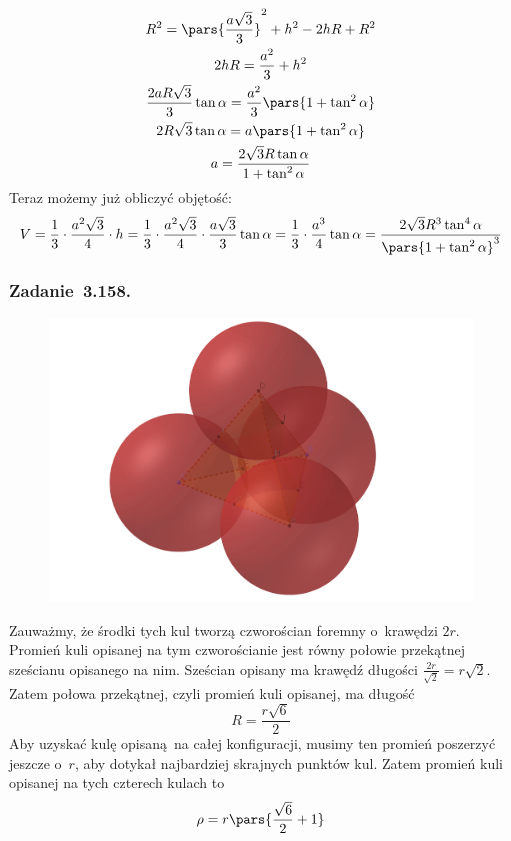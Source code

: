 \begin{gather*}
    R^2 = \pars{\frac{a\sqrt{3}}{3}}^2 + h^2 - 2hR + R^2\\
    2hR = \frac{a^2}{3} + h^2\\
    \frac{2aR\sqrt{3}}{3}\tan\alpha = \frac{a^2}{3}\pars{1 + \tan^2\alpha}\\
    2R\sqrt{3}\tan\alpha = a\pars{1 + \tan^2\alpha}\\
    a = \frac{2\sqrt{3}R\tan\alpha}{1 + \tan^2\alpha}
\end{gather*}
Teraz możemy już obliczyć objętość:
\begin{equation*}
    V
    = \frac{1}{3} \cdot \frac{a^2\sqrt{3}}{4} \cdot h
    = \frac{1}{3} \cdot \frac{a^2\sqrt{3}}{4} \cdot \frac{a\sqrt{3}}{3}\tan\alpha
    = \frac{1}{3} \cdot \frac{a^3}{4}\tan\alpha
    = \frac{2\sqrt{3}R^3\tan^4\alpha}{\pars{1 + \tan^2\alpha}^3}
\end{equation*}
\subsubsection*{Zadanie~3.158.}
\begin{figure}[H]
    \centering
    \includegraphics[width=\textwidth]{img/2021_02_26/158/space.png}
\end{figure}
Zauważmy, że środki tych kul tworzą czworościan foremny o~krawędzi \(2r\). Promień kuli opisanej na tym czworościanie jest równy połowie przekątnej sześcianu opisanego na nim. Sześcian opisany ma krawędź długości \(\frac{2r}{\sqrt{2}} = r\sqrt{2}\). Zatem połowa przekątnej, czyli promień kuli opisanej, ma długość
\begin{equation*}
    R = \frac{r\sqrt{6}}{2}
\end{equation*}
Aby uzyskać kulę opisaną na całej konfiguracji, musimy ten promień poszerzyć jeszcze o~\(r\), aby dotykał najbardziej skrajnych punktów kul. Zatem promień kuli opisanej na tych czterech kulach to
\begin{equation*}
    \rho = r\pars{\frac{\sqrt{6}}{2} + 1}
\end{equation*}
